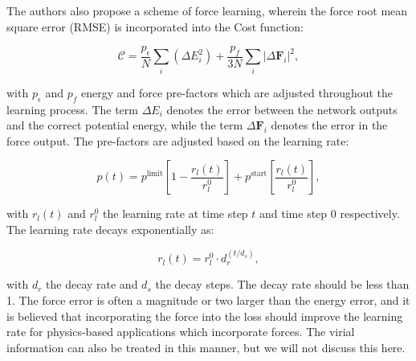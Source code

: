 The authors also propose a scheme of force learning, wherein
the force root mean square error (RMSE) is incorporated into the Cost function:

\begin{equation}
    \mathcal{C} = \frac{p_{\epsilon}}{N} \sum_i
    \left( \Delta E_i^2 \right)
    + \frac{p_{f}}{3N} \sum_i \left| \Delta \bm{F}_i \right|^2,
\end{equation}

with $p_{\epsilon}$ and $p_{f}$ energy and force pre-factors which are
adjusted throughout the learning process. The term $\Delta E_i$
denotes the error between the network outputs
and the correct potential energy, while the term $\Delta \bm{F}_i$
denotes the error in the force output.
The pre-factors are adjusted based on the learning rate:

\begin{equation}
    p(t) = p^{\text{limit}} \left[ 1 - \frac{r_l(t)}{r_l^0} \right]
    + p^{\text{start}} \left[ \frac{r_l(t)}{r_l^0} \right] ,
\end{equation}

with $r_l(t)$ and $r_l^0$ the learning rate at time step $t$ and time step
$0$ respectively. The learning rate decays exponentially as:

\begin{equation}
 r_l(t) = r_l^0 \cdot d_{r}^{\left(t / d_s\right)} , 
\end{equation}

with $d_r$ the decay rate and $d_s$ the decay steps. The decay
rate should be less than 1. The force error is often a magnitude or two
larger than the energy error, and it is believed that incorporating
the force into the loss should improve the learning rate for
physics-based applications which incorporate forces.
The virial information can also be treated in this manner,
but we will not discuss this here.
